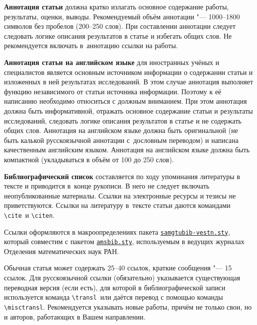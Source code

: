 \smallskip

\textbf{Аннотация статьи} должна кратко излагать основное содержание работы, результаты, оценки, выводы.
Рекомендуемый объём аннотации "--- 1000–1800 символов без пробелов (200–250 слов).
При составлении аннотации следует следовать логике описания результатов в статье и избегать общих слов.
Не рекомендуется включать в~аннотацию ссылки на работы. 

\smallskip

\textbf{Аннотация статьи на английском языке}  для иностранных учёных и специалистов является основным источником информации о содержании статьи и изложенных в ней результатах исследований. 
В этом случае аннотация выполняет функцию независимого от статьи источника информации.
Поэтому к её написанию необходимо относиться с должным вниманием.
При этом аннотация должна быть информативной, отражать основное содержание статьи и результаты
исследований, следовать логике описания результатов в статье и не содержать общих слов.
Аннотация на английском языке должна быть  оригинальной (не быть калькой русскоязычной аннотации с~дословным переводом) и написана качественным английским языком.
Аннотация на английском языке должна быть компактной (укладываться в объём от 100 до 250 слов).


\smallskip


\textbf{Библиографический список} составляется по ходу упоминания литературы в тексте и приводится в~конце рукописи. 
В него не следует включать неопубликованные материалы.
Ссылки на электронные ресурсы и тезисы не приветствуются. 
Ссылки на литературу в~тексте статьи даются командами \verb"\cite"\ и \verb"\citen".

Ссылки оформляются в макроопределениях пакета \href{http://www.mathnet.ru/supplement/authornotes/sample.zip}{\tt samgtubib-vestn.sty}, который совместим с пакетом \href{http://www.mathnet.ru/poffice/amsbibpackage.phtml?wshow=amsbibpackage&option_lang=rus}{\tt amsbib.sty}, используемым в ведущих журналах Отделения математических наук РАН. 

Обычная статья может содержать 25–40 ссылок, краткие сообщения "--- 15 ссылок.
Для русскоязычной ссылки (обязательно) указывается существующая переводная версия (если есть), для которой в библиографической записи используется команда \verb"\transl"\ или даётся перевод с помощью команды \verb"\misctransl".
Рекомендуется указывать новые работы, причём не только свои, но и авторов, работающих в Вашем направлении.




\smallskip

\centerline{}


\newpage

%
